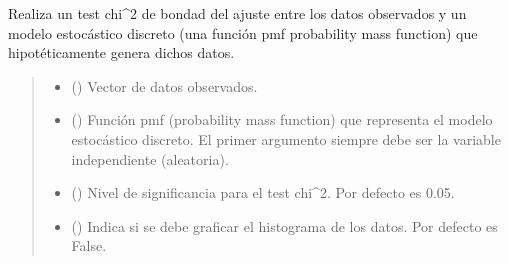 \documentclass[letterpaper,10pt,english]{sphinxmanual}
\begin{document}

\begin{fulllineitems}
\label{\detokenize{utils.stats:utils.stats.chisq_gof_discrete}}
\pysigstartsignatures
{}
\pysigstopsignatures
\sphinxAtStartPar
Realiza un test chi\textasciicircum{}2 de bondad del ajuste entre los datos observados y un modelo
estocástico discreto (una función pmf \sphinxhyphen{}probability mass function\sphinxhyphen{}) que hipotéticamente
genera dichos datos.
\begin{quote}\begin{description}
\begin{itemize}
\item {} 
\sphinxAtStartPar
{} () \textendash{} Vector de datos observados.

\item {} 
\sphinxAtStartPar
{} () \textendash{} Función pmf (probability mass function) que representa el modelo estocástico discreto.
El primer argumento siempre debe ser la variable independiente (aleatoria).

\item {} 
\sphinxAtStartPar
{} (\sphinxstyleliteralemphasis{\sphinxupquote{, }}) \textendash{} Nivel de significancia para el test chi\textasciicircum{}2. Por defecto es 0.05.

\item {} 
\sphinxAtStartPar
{} (\sphinxstyleliteralemphasis{\sphinxupquote{, }}) \textendash{} Indica si se debe graficar el histograma de los datos. Por defecto es False.


\end{itemize}
\end{description}
\end{quote}
\end{fulllineitems}
\end{document}
